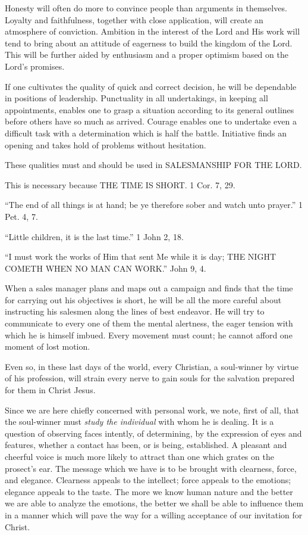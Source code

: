 \documentclass[
]{book}
\begin{document}
Honesty will often do more to convince people than arguments in themselves. Loyalty and faithfulness, together with close application, will create an atmosphere of conviction. Ambition in the interest of the Lord and His work will tend to bring about an attitude of eagerness to build the kingdom of the Lord. This will be further aided by enthusiasm and a proper optimism based on the Lord's promises.

If one cultivates the quality of quick and correct decision, he will be dependable in positions of leadership. Punctuality in all undertakings, in keeping all appointments, enables one to grasp a situation according to its general outlines before others have so much as arrived. Courage enables one to undertake even a difficult task with a determination which is half the battle. Initiative finds an opening and takes hold of problems without hesitation.

These qualities must and should be used in SALESMANSHIP FOR THE LORD.

This is necessary because THE TIME IS SHORT. 1 Cor. 7, 29.

``The end of all things is at hand; be ye therefore sober and watch unto prayer.'' 1 Pet. 4, 7.

``Little children, it is the last time.'' 1 John 2, 18.

``I must work the works of Him that sent Me while it is day; THE NIGHT COMETH WHEN NO MAN CAN WORK.'' John 9, 4.

When a sales manager plans and maps out a campaign and finds that the time for carrying out his objectives is short, he will be all the more careful about instructing his salesmen along the lines of best endeavor. He will try to communicate to every one of them the mental alertness, the eager tension with which he is himself imbued. Every movement must count; he cannot afford one moment of lost motion.

Even so, in these last days of the world, every Christian, a soul-winner by virtue of his profession, will strain every nerve to gain souls for the salvation prepared for them in Christ Jesus.

Since we are here chiefly concerned with personal work, we note, first of all, that the soul-winner must \emph{study the individual} with whom he is dealing. It is a question of observing faces intently, of determining, by the expression of eyes and features, whether a contact has been, or is being, established. A pleasant and cheerful voice is much more likely to attract than one which grates on the prosect's ear. The message which we have is to be brought with clearness, force, and elegance. Clearness appeals to the intellect; force appeals to the emotions; elegance appeals to the taste. The more we know human nature and the better we are able to analyze the emotions, the better we shall be able to influence them in a manner which will pave the way for a willing acceptance of our invitation for Christ.
\end{document}
